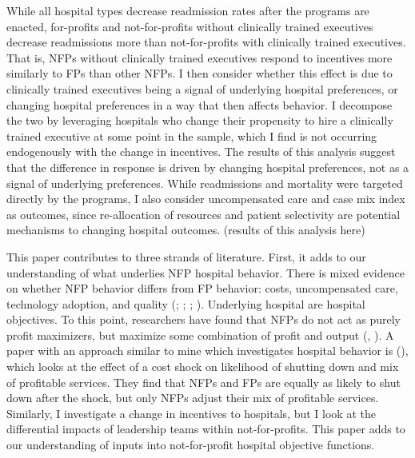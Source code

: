 \documentclass[12pt]{article}
\begin{document}
   While all hospital types decrease readmission rates after the programs are enacted, for-profits and not-for-profits without clinically trained executives decrease readmissions more than not-for-profits with clinically trained executives. That is, NFPs without clinically trained executives respond to incentives more similarly to FPs than other NFPs. I then consider whether this effect is due to clinically trained executives being a signal of underlying hospital preferences, or changing hospital preferences in a way that then affects behavior. I decompose the two by leveraging hospitals who change their propensity to hire a clinically trained executive at some point in the sample, which I find is not occurring endogenously with the change in incentives. The results of this analysis suggest that the difference in response is driven by changing hospital preferences, not as a signal of underlying preferences. While readmissions and mortality were targeted directly by the programs, I also consider uncompensated care and case mix index as outcomes, since re-allocation of resources and patient selectivity are potential mechanisms to changing hospital outcomes. (results of this analysis here)

    This paper contributes to three strands of literature. First, it adds to our understanding of what underlies NFP hospital behavior. There is mixed evidence on whether NFP behavior differs from FP behavior: costs, uncompensated care, technology adoption, and quality (\cite{sloan2000not}; \cite{eggleston2008hospital}; \cite{moscelli2018effect}; \cite{moscone2020public}). Underlying hospital are hospital objectives. To this point, researchers have found that NFPs do not act as purely profit maximizers, but maximize some combination of profit and output (\cite{deneffe2002not}, \cite{chang2011not-for-profit}). A paper with an approach similar to mine which investigates hospital behavior is \citeauthor{chang2011not-for-profit} (\citeyear{chang2011not-for-profit}), which looks at the effect of a cost shock on likelihood of shutting down and mix of profitable services. They find that NFPs and FPs are equally as likely to shut down after the shock, but only NFPs adjust their mix of profitable services. Similarly, I investigate a change in incentives to hospitals, but I look at the differential impacts of leadership teams within not-for-profits. This paper adds to our understanding of inputs into not-for-profit hospital objective functions. 
\end{document}
